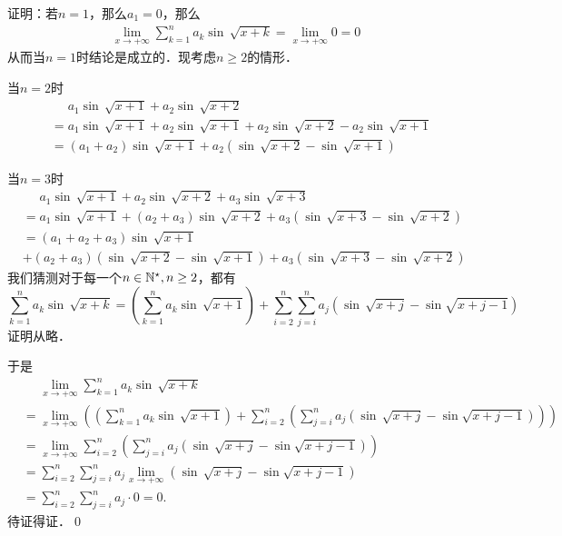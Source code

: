 证明：若$n=1$，那么$a_1=0$，那么
\begin{eqnarray}
    \lim_{x \to +\infty} \sum_{k=1}^n a_k \sin \, \sqrt{x+k} = \lim_{x \to +\infty} 0 = 0
\end{eqnarray}
从而当$n=1$时结论是成立的．现考虑$n \geq 2$的情形．

当$n=2$时
\begin{align}
    &\mathrel{\phantom{=}} a_1 \sin \, \sqrt{x+1} + a_2 \sin \, \sqrt{x+2} \\
    &= a_1 \sin \, \sqrt{x+1} + a_2 \sin \, \sqrt{x+1} + a_2 \sin \, \sqrt{x+2} - a_2 \sin \, \sqrt{x+1} \\
    &= (a_1 + a_2) \sin \, \sqrt{x+1} + a_2 \left(\sin \, \sqrt{x+2} - \sin \, \sqrt{x+1} \right)
\end{align}

当$n=3$时
\begin{align}
    &\mathrel{\phantom{=}} a_1 \sin \, \sqrt{x+1} + a_2 \sin \, \sqrt{x+2} + a_3 \sin \, \sqrt{x+3} \\
    &= a_1 \sin \, \sqrt{x+1} + \left( a_2 + a_3 \right) \sin \, \sqrt{x+2} + a_3 \left( \sin \, \sqrt{x+3} - \sin \, \sqrt{x+2} \right) \\
    &= \left(a_1 + a_2 + a_3\right) \sin \, \sqrt{x+1} \\
    &+ \left(a_2 + a_3\right) \left(\sin \, \sqrt{x+2} - \sin \, \sqrt{x+1}\right) + a_3 \left(\sin \, \sqrt{x+3} - \sin \, \sqrt{x+2}\right)
\end{align}
我们猜测对于每一个$n \in \mathbb{N}^\star, n \geq 2$，都有
\begin{equation}
    \sum_{k = 1}^n a_k \sin \, \sqrt{x+k} = \left( \sum_{k = 1}^{n} a_k \sin \, \sqrt{x+1} \right) + \sum_{i=2}^n \sum_{j=i}^n a_j \left( \sin \, \sqrt{x+j} - \sin \sqrt{x+j-1} \right) 
\end{equation}
证明从略．

于是
\begin{align}
    &\mathrel{\phantom{=}} \lim_{x \to +\infty} \sum_{k=1}^{n} a_k \sin \, \sqrt{x+k} \\
    &= \lim_{x \to +\infty} \left( \left( \sum_{k = 1}^{n} a_k \sin \, \sqrt{x+1} \right) + \sum_{i=2}^n \left(\sum_{j=i}^n a_j \left( \sin \, \sqrt{x+j} - \sin \sqrt{x+j-1} \right) \right) \right) \\
    &= \lim_{x \to +\infty} \sum_{i=2}^n \left(\sum_{j=i}^n a_j \left( \sin \, \sqrt{x+j} - \sin \sqrt{x+j-1} \right) \right) \\
    &= \sum_{i=2}^n \sum_{j=i}^n a_j \lim_{x \to +\infty} \left( \sin \, \sqrt{x+j} - \sin \sqrt{x+j-1} \right) \\
    &= \sum_{i=2}^n \sum_{j=i}^n a_j \cdot 0 = 0.
\end{align}
待证得证．\qed

